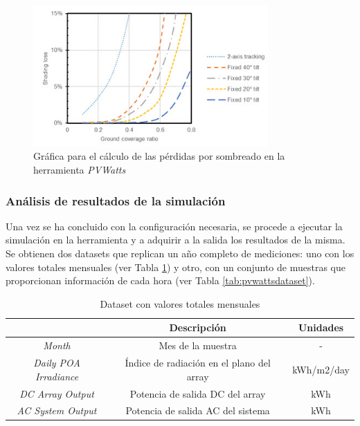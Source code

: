 \begin{figure}[H]
    \centering
    \includegraphics[width=0.8\textwidth]{img/diseno/sombra.png}
    \caption{Gráfica para el cálculo de las pérdidas por sombreado en la herramienta \textit{PVWatts}~\cite{pvwatts}}
    \label{fig:sombra}
\end{figure}

\subsubsection{Análisis de resultados de la simulación}

Una vez se ha concluido con la configuración necesaria, se procede a ejecutar la simulación en la herramienta y a adquirir a la salida los resultados de la misma. Se obtienen dos datasets que replican un año completo de mediciones: uno con los valores totales mensuales (ver Tabla \ref{tab:pvwattsdataset2}) y otro, con un conjunto de muestras que proporcionan información de cada hora (ver Tabla \ref{tab:pvwattsdataset}). 

\vspace{3mm}


\begin{table}[h!]
    \centering
    \begin{tabular}{|c|c|c|}
    \hline
    \rowcolor[HTML]{AAAAAA} 
    \multicolumn{1}{|c|}{\cellcolor[HTML]{AAAAAA}Campo} & \multicolumn{1}{c|}{\cellcolor[HTML]{AAAAAA}Descripción} & Unidades \\ \hline
    \textit{Month} & Mes de la muestra & - \\ \hline
    \textit{Daily POA Irradiance} & Índice de radiación en el plano del array & kWh/m2/day \\ \hline 
    \textit{DC Array Output} & Potencia de salida DC del array & kWh \\ \hline
    \textit{AC System Output} & Potencia de salida AC del sistema & kWh \\ \hline
    \end{tabular}
    \caption{Dataset con valores totales mensuales \cite{pvwatts}}
    \label{tab:pvwattsdataset2}
\end{table}

